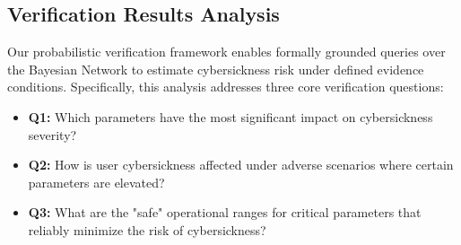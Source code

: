 \documentclass{vgtc}                          %
\begin{document}




\subsection{Verification Results Analysis}
\label{subsec:verification_result}
Our probabilistic verification framework enables formally grounded queries over the Bayesian Network to estimate cybersickness risk under defined evidence conditions. Specifically, this analysis addresses three core verification questions:
\begin{itemize}[leftmargin=*, itemsep=0pt, topsep=2pt] 
    \item \textbf{Q1:} Which parameters have the most significant impact on cybersickness severity?
    \item \textbf{Q2:} How is user cybersickness affected under adverse scenarios where certain parameters are elevated?
    \item \textbf{Q3:} What are the "safe" operational ranges for critical parameters that reliably minimize the risk of cybersickness?
\end{itemize}
\end{document}
